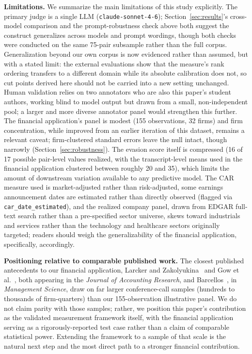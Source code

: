 \documentclass[conference]{IEEEtran}
\begin{document}
\textbf{Limitations.} We summarize the main limitations of this study explicitly. The primary judge is a single LLM (\texttt{claude-sonnet-4-6}); Section~\ref{sec:results}'s cross-model comparison and the prompt-robustness check above both suggest the construct generalizes across models and prompt wordings, though both checks were conducted on the same 75-pair subsample rather than the full corpus. Generalization beyond our own corpus is now evidenced rather than assumed, but with a stated limit: the external evaluations show that the measure's rank ordering transfers to a different domain while its absolute calibration does not, so cut points derived here should not be carried into a new setting unchanged. Human validation relies on two annotators who are also this paper's student authors, working blind to model output but drawn from a small, non-independent pool; a larger and more diverse annotator panel would strengthen this further. The financial application's panel is modest (155 observations, 32 firms) and firm concentration, while improved from an earlier iteration of this dataset, remains a relevant caveat; firm-clustered standard errors leave the null intact, though narrowly (Section~\ref{sec:robustness}). The evasion score itself is compressed (16 of 17 possible pair-level values realized, with the transcript-level means used in the financial application clustered between roughly 20 and 35), which limits the amount of downstream variation available to any predictive model. The CAR measure used is market-adjusted rather than risk-adjusted, some earnings announcement dates are estimated rather than directly observed (flagged via \texttt{car\_date\_estimated}), and the realized company panel, drawn from EDGAR full-text search rather than a pre-specified sector universe, skews toward industrials and services rather than the technology and healthcare sectors originally targeted; readers should weigh the generalizability of the financial application, specifically, accordingly.

\textbf{Positioning relative to comparable published work.} The closest published antecedents to our financial application, Larcker and Zakolyukina~\cite{larcker2012detecting} and Gow et al.~\cite{gow2021nonanswers}, both appearing in the \emph{Journal of Accounting Research}, and Barcellos~\cite{barcellos2025overcoming}, in \emph{Management Science}, draw on far larger conference-call samples (hundreds to thousands of firm-quarters) than our 155-observation illustrative panel. We do not claim parity with those samples; rather, we position this paper's contribution as the validated measurement framework itself, with the financial application serving as a rigorously-reported test case rather than a claim of comparable statistical power. Extending the framework to a sample of that scale is the natural next step and the most direct path to a stronger financial contribution.
\end{document}
